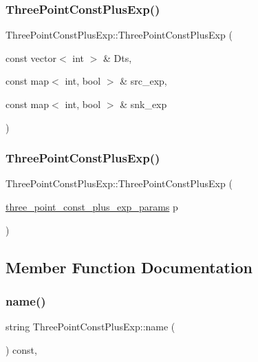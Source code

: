 \subsubsection{\texorpdfstring{ThreePointConstPlusExp()}{ThreePointConstPlusExp()}\hspace{0.1cm}{\footnotesize\ttfamily [1/2]}}
{\footnotesize\ttfamily Three\+Point\+Const\+Plus\+Exp\+::\+Three\+Point\+Const\+Plus\+Exp (\begin{DoxyParamCaption}\item[{const vector$<$ int $>$ \&}]{Dts,  }\item[{const map$<$ int, bool $>$ \&}]{src\+\_\+exp,  }\item[{const map$<$ int, bool $>$ \&}]{snk\+\_\+exp }\end{DoxyParamCaption})}

\mbox{\label{classThreePointConstPlusExp_a22e4550ffd1bd789ab3a010d019fa2bd}} 
\subsubsection{\texorpdfstring{ThreePointConstPlusExp()}{ThreePointConstPlusExp()}\hspace{0.1cm}{\footnotesize\ttfamily [2/2]}}
{\footnotesize\ttfamily Three\+Point\+Const\+Plus\+Exp\+::\+Three\+Point\+Const\+Plus\+Exp (\begin{DoxyParamCaption}\item[{\mbox{\hyperlink{structthree__point__const__plus__exp__params}{three\+\_\+point\+\_\+const\+\_\+plus\+\_\+exp\+\_\+params}}}]{p }\end{DoxyParamCaption})}



\subsection{Member Function Documentation}
\mbox{\label{classThreePointConstPlusExp_ad7943ef83c3c7b511612e030797ece4a}} 
\subsubsection{\texorpdfstring{name()}{name()}}
{\footnotesize\ttfamily string Three\+Point\+Const\+Plus\+Exp\+::name (\begin{DoxyParamCaption}{ }\end{DoxyParamCaption}) const\hspace{0.3cm}{\ttfamily [inline]}, {\ttfamily [virtual]}}



